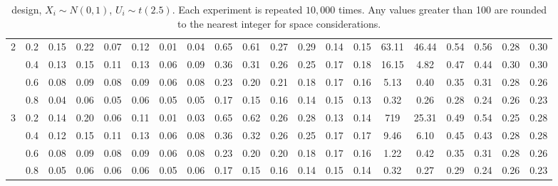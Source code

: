\begin{table}
\begin{threeparttable}
\begin{tabular}{c c|c c c c c c|c c c c c c|c c c c c c}
\multirow{4}{*}{2} & 0.2 & 0.15 & 0.22 & 0.07 & 0.12 & 0.01 & 0.04 & 0.65 & 0.61 & 0.27 & 0.29 & 0.14 & 0.15 & 63.11 & 46.44 & 0.54 & 0.56 & 0.28 & 0.30 \\
& 0.4 & 0.13 & 0.15 & 0.11 & 0.13 & 0.06 & 0.09 & 0.36 & 0.31 & 0.26 & 0.25 & 0.17 & 0.18 & 16.15 & 4.82 & 0.47 & 0.44 & 0.30 & 0.30 \\
& 0.6 & 0.08 & 0.09 & 0.08 & 0.09 & 0.06 & 0.08 & 0.23 & 0.20 & 0.21 & 0.18 & 0.17 & 0.16 & 5.13 & 0.40 & 0.35 & 0.31 & 0.28 & 0.26 \\
& 0.8 & 0.04 & 0.06 & 0.05 & 0.06 & 0.05 & 0.05 & 0.17 & 0.15 & 0.16 & 0.14 & 0.15 & 0.13 & 0.32 & 0.26 & 0.28 & 0.24 & 0.26 & 0.23 \\
\hline
\multirow{4}{*}{3} & 0.2 & 0.14 & 0.20 & 0.06 & 0.11 & 0.01 & 0.03 & 0.65 & 0.62 & 0.26 & 0.28 & 0.13 & 0.14 & 719 & 25.31 & 0.49 & 0.54 & 0.25 & 0.28 \\
& 0.4 & 0.12 & 0.15 & 0.11 & 0.13 & 0.06 & 0.08 & 0.36 & 0.32 & 0.26 & 0.25 & 0.17 & 0.17 & 9.46 & 6.10 & 0.45 & 0.43 & 0.28 & 0.28 \\
& 0.6 & 0.08 & 0.09 & 0.08 & 0.09 & 0.06 & 0.08 & 0.23 & 0.20 & 0.20 & 0.18 & 0.17 & 0.16 & 1.22 & 0.42 & 0.35 & 0.31 & 0.28 & 0.26 \\
& 0.8 & 0.05 & 0.06 & 0.06 & 0.06 & 0.05 & 0.06 & 0.17 & 0.15 & 0.16 & 0.14 & 0.15 & 0.14 & 0.32 & 0.27 & 0.29 & 0.24 & 0.26 & 0.23 \\
\hline
\hline
\end{tabular}
\caption*{\citet{lee2008randomized} design, $X_i \sim N(0,1)$, $U_i \sim t(2.5)$. Each experiment is repeated $10,000$ times. Any values greater than 100 are rounded to the nearest integer for space considerations.}
\label{table estimation lee normal t}
\end{threeparttable}
\end{table}
